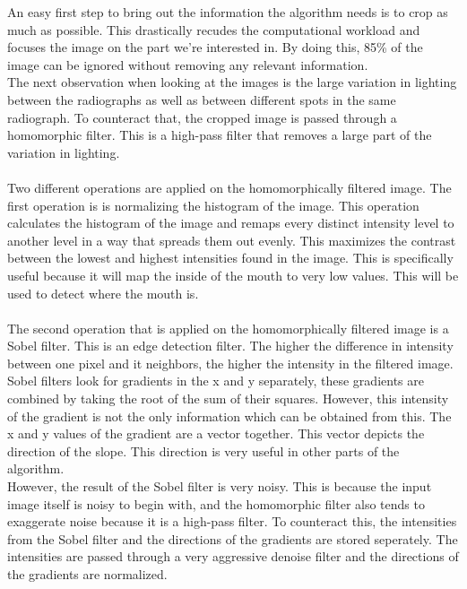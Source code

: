 \documentclass[a4paper,10pt]{article}
\begin{document}
An easy first step to bring out the information the algorithm needs is to crop as much as possible. This drastically recudes the computational workload and focuses the image on the part we're interested in. By doing this, 85\% of the image can be ignored without removing any relevant information.
\\
The next observation when looking at the images is the large variation in lighting between the radiographs as well as between different spots in the same radiograph. To counteract that, the cropped image is passed through a homomorphic filter. This is a high-pass filter that removes a large part of the variation in lighting.
\\\\
Two different operations are applied on the homomorphically filtered image. The first operation is is normalizing the histogram of the image. This operation calculates the histogram of the image and remaps every distinct intensity level to another level in a way that spreads them out evenly. This maximizes the contrast between the lowest and highest intensities found in the image. This is specifically useful because it will map the inside of the mouth to very low values. This will be used to detect where the mouth is.\\\\
The second operation that is applied on the homomorphically filtered image is a Sobel filter. This is an edge detection filter. The higher the difference in intensity between one pixel and it neighbors, the higher the intensity in the filtered image. Sobel filters look for gradients in the x and y  separately, these gradients are combined by taking the root of the sum of their squares. However, this intensity of the gradient is not the only information which can be obtained from this. The x and y values of the gradient are a vector together. This vector depicts the direction of the slope. This direction is very useful in other parts of the algorithm. \\
However, the result of the Sobel filter is very noisy. This is because the input image itself is noisy to begin with, and the homomorphic filter also tends to exaggerate noise because it is a high-pass filter. To counteract this, the intensities from the Sobel filter and the directions of the gradients are stored seperately. The intensities are passed through a very aggressive denoise filter and the directions of the gradients are normalized.
\end{document}
